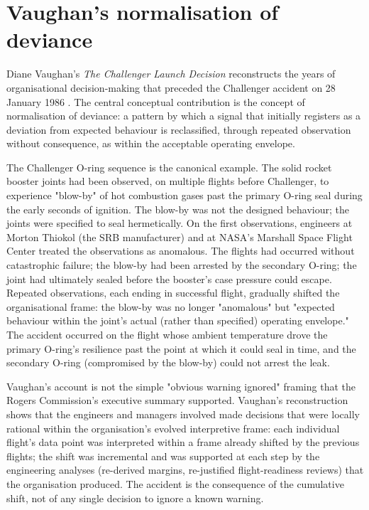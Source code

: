 \section{Vaughan's normalisation of deviance}

Diane Vaughan's \emph{The Challenger Launch Decision} \cite{hist:vaughan1996} reconstructs the years of organisational decision-making that preceded the Challenger accident on 28 January 1986 \cite{acc:nasa-challenger}. The central conceptual contribution is the concept of normalisation of deviance: a pattern by which a signal that initially registers as a deviation from expected behaviour is reclassified, through repeated observation without consequence, as within the acceptable operating envelope.

The Challenger O-ring sequence is the canonical example. The solid rocket booster joints had been observed, on multiple flights before Challenger, to experience "blow-by" of hot combustion gases past the primary O-ring seal during the early seconds of ignition. The blow-by was not the designed behaviour; the joints were specified to seal hermetically. On the first observations, engineers at Morton Thiokol (the SRB manufacturer) and at NASA's Marshall Space Flight Center treated the observations as anomalous. The flights had occurred without catastrophic failure; the blow-by had been arrested by the secondary O-ring; the joint had ultimately sealed before the booster's case pressure could escape. Repeated observations, each ending in successful flight, gradually shifted the organisational frame: the blow-by was no longer "anomalous" but "expected behaviour within the joint's actual (rather than specified) operating envelope." The accident occurred on the flight whose ambient temperature drove the primary O-ring's resilience past the point at which it could seal in time, and the secondary O-ring (compromised by the blow-by) could not arrest the leak.

Vaughan's account is not the simple "obvious warning ignored" framing that the Rogers Commission's executive summary supported. Vaughan's reconstruction shows that the engineers and managers involved made decisions that were locally rational within the organisation's evolved interpretive frame: each individual flight's data point was interpreted within a frame already shifted by the previous flights; the shift was incremental and was supported at each step by the engineering analyses (re-derived margins, re-justified flight-readiness reviews) that the organisation produced. The accident is the consequence of the cumulative shift, not of any single decision to ignore a known warning.

